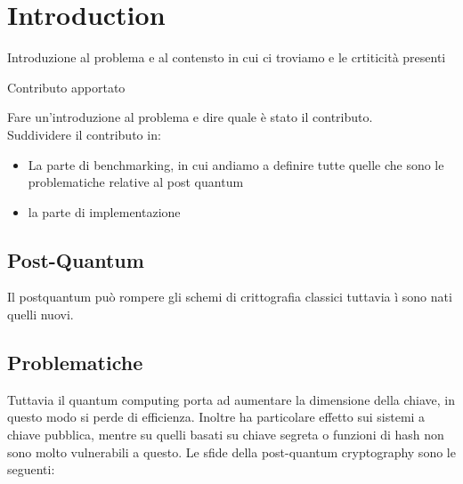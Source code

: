 
\chapter{Introduction} 

\label{introduction}  

Introduzione al problema e al contensto in cui ci troviamo e le crtiticità presenti

Contributo apportato


\newcommand{\keyword}[1]{\textbf{#1}}
\newcommand{\tabhead}[1]{\textbf{#1}}
\newcommand{\code}[1]{\texttt{#1}}
\newcommand{\file}[1]{\texttt{\bfseries#1}}
\newcommand{\option}[1]{\texttt{\itshape#1}}


Fare un'introduzione al problema e dire quale è stato il contributo.\\
Suddividere il contributo in:

\begin{itemize}
	\item La parte di benchmarking, in cui andiamo a definire tutte quelle che sono le problematiche relative al post quantum 
	\item la parte di implementazione
\end{itemize}


\section{Post-Quantum}

Il postquantum può rompere gli schemi di crittografia classici tuttavia ì sono nati quelli nuovi.

\section{Problematiche}
Tuttavia il quantum computing porta ad aumentare la dimensione della chiave, in questo modo si perde di efficienza. Inoltre ha particolare effetto sui sistemi a chiave
pubblica, mentre su quelli basati su chiave segreta o funzioni di hash non sono molto vulnerabili a questo.
Le sfide della post-quantum cryptography sono le seguenti:

